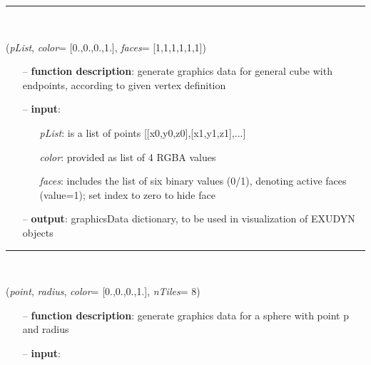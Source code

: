 \begin{itemize}[leftmargin=1.4cm]
\begin{itemize}[leftmargin=0.5cm]
\begin{itemize}[leftmargin=1.4cm]
\begin{itemize}[leftmargin=0.5cm]
\begin{itemize}[leftmargin=1.4cm]
\begin{itemize}[leftmargin=0.5cm]
%
\noindent\rule{8cm}{0.75pt}\vspace{1pt} \\ 
\begin{flushleft}
\label{sec:graphicsDataUtilities:GraphicsDataCube}
({\it pList}, {\it color}= [0.,0.,0.,1.], {\it faces}= [1,1,1,1,1,1])
\end{flushleft}
\setlength{\itemindent}{0.7cm}
\begin{itemize}[leftmargin=0.7cm]
  \item[--]  {\bf function description}: generate graphics data for general cube with endpoints, according to given vertex definition  \item[--]  {\bf input}: \vspace{-6pt}
  \begin{itemize}[leftmargin=1.2cm]
\setlength{\itemindent}{-0.7cm}
    \item[] {\it pList}: is a list of points [[x0,y0,z0],[x1,y1,z1],...]
    \item[] {\it   color}: provided as list of 4 RGBA values
    \item[] {\it   faces}: includes the list of six binary values (0/1), denoting active faces (value=1); set index to zero to hide face
  \end{itemize}
  \item[--]  {\bf output}: graphicsData dictionary, to be used in visualization of EXUDYN objects\vspace{12pt}\end{itemize}
%
\noindent\rule{8cm}{0.75pt}\vspace{1pt} \\ 
\begin{flushleft}
\label{sec:graphicsDataUtilities:GraphicsDataSphere}
({\it point}, {\it radius}, {\it color}= [0.,0.,0.,1.], {\it nTiles}= 8)
\end{flushleft}
\setlength{\itemindent}{0.7cm}
\begin{itemize}[leftmargin=0.7cm]
  \item[--]  {\bf function description}: generate graphics data for a sphere with point p and radius  \item[--]  {\bf input}: \vspace{-6pt}
  \begin{itemize}[leftmargin=1.2cm]

\end{itemize}
\end{itemize}
\end{itemize}
\end{itemize}
\end{itemize}
\end{itemize}
\end{itemize}
\end{itemize}
